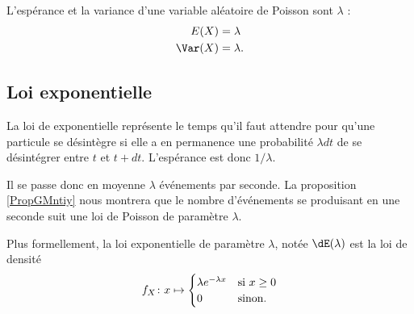\begin{theorem}      \label{ThojDZjuj}
    L'espérance et la variance d'une variable aléatoire de Poisson sont \( \lambda\) :
    \begin{subequations}
        \begin{align}
            E(X)&=\lambda\\
            \Var(X)&=\lambda.
        \end{align}
    \end{subequations}
\end{theorem}

\subsection{Loi exponentielle}

La loi de exponentielle représente le temps qu'il faut attendre pour qu'une particule se désintègre si elle a en permanence une probabilité \( \lambda dt\) de se désintégrer entre \( t\) et \( t+dt\). L'espérance est donc \( 1/\lambda\).

Il se passe donc en moyenne \( \lambda\) événements par seconde. La proposition \ref{PropGMntiy} nous montrera que le nombre d'événements se produisant en une seconde suit une loi de Poisson de paramètre \( \lambda\).

Plus formellement, la loi exponentielle de paramètre \( \lambda\), notée \( \dE(\lambda)\) est la loi de densité
\begin{equation}
    f_X\colon x\mapsto\begin{cases}
        \lambda e^{-\lambda x}    &   \text{si \( x\geq 0\)}\\
        0    &    \text{sinon}.
    \end{cases}
\end{equation}

